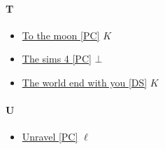 		\paragraph{T} \hypertarget{GT}{}
			\begin{itemize}
				\item \href{https://mega.nz/#F!K0U22Y4T!wO7s6PShtfwfEGjK8cdwgQ} {To the moon [PC]} $K$ \\ 
				\item \href{https://mega.nz/#!OPpjwJZK!GbsUE3tqQcVSLe54YHhgyfGHjME8KugLexxrvbF57rk} {The sims 4 [PC]} $\bot$ \\
				\item \href{https://mega.nz/#F!7tdDBZAD!lRV6Q8jHw-c4kiKAzKPpgQ} {The world end with you [DS]} $K$ \\ 
				
				
			\end{itemize}
		
		\paragraph{U} \hypertarget{GU}{}
			\begin{itemize}
				
				\item \href{https://mega.nz/#!rC5zSCKB!IRHte3PP_hj-LipVEFUEx8TSNkxyitvJq6jek3iTcFM} {Unravel [PC]} $\ell$ \\ 				
				
			\end{itemize}
	